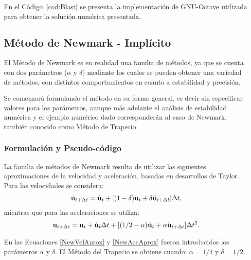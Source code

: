 En el Código~\ref{cod:Blast} se presenta la implementación de GNU-Octave utilizada para obtener la solución numérica presentada.



\subsection{Método de Newmark - Implícito} \label{sec:newmarkLineal}

El Método de Newmark es en realidad una familia de métodos, ya que se cuenta con dos parámetros ($\alpha$ y $\delta$) mediante los cuales se pueden obtener una variedad de métodos, con distintos comportamientos en cuanto a estabilidad y precisión.

Se comenzará formulando el método en su forma general, es decir sin especificar valores para los parámetros, aunque más adelante el análisis de estabilidad numérica y el ejemplo numérico dado corresponderán al caso de Newmark, también conocido como Método de Trapecio.

\subsubsection{Formulación y Pseudo-código} \label{FormNewmarkLin}
La familia de métodos de Newmark resulta de utilizar las siguientes aproximaciones de la velocidad y aceleración, basadas en desarrollos de Taylor. Para las velocidades se considera:
%
\begin{equation}\label{NewVelAprox}
	\dot{{\bf u}}_{t+\Delta t} = \dot{{\bf u}}_t + [(1-\delta)\ddot{{\bf u}}_t + \delta\ddot{{\bf u}}_{t+\Delta t}]\Delta t,
\end{equation}
mientras que para las aceleraciones se utiliza:
\begin{equation}\label{NewAccAprox}
{\bf u}_{t+\Delta t} = {\bf u}_t + \dot{{\bf u}}_t\Delta t + [(1/2-\alpha)\ddot{{\bf u}}_t + \alpha\ddot{{\bf u}}_{t+\Delta t}]\Delta t^2.
\end{equation}

En las Ecuaciones \eqref{NewVelAprox} y \eqref{NewAccAprox} fueron introducidos los parámetros $\alpha$ y $\delta$. %
%
El Método del Trapecio se obtiene cuando: $\alpha = 1/4$ y $\delta = 1/2$.

